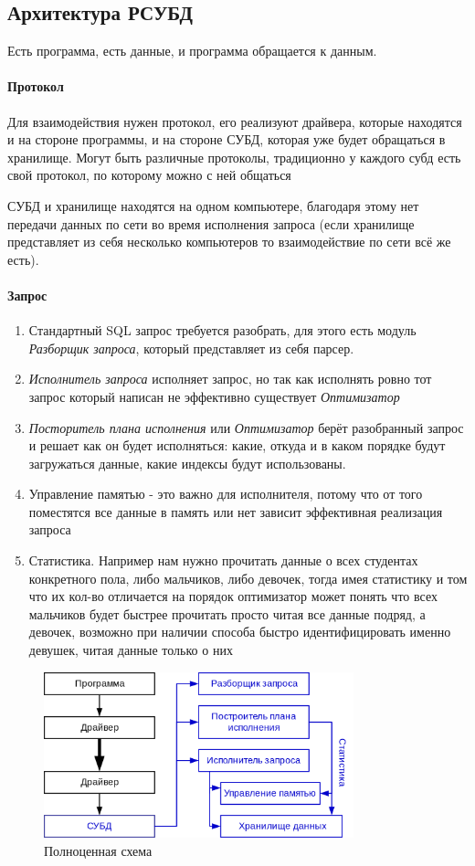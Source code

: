 \subsection{Архитектура РСУБД}
Есть программа, есть данные, и программа обращается к данным. \paragraph{Протокол} Для взаимодействия нужен протокол, его реализуют драйвера, которые находятся и на стороне программы, и на стороне СУБД, которая уже будет обращаться в хранилище. Могут быть различные протоколы, традиционно у каждого субд есть свой протокол, по которому можно с ней общаться
\begin{remark}
	СУБД и хранилище находятся на одном компьютере, благодаря этому нет передачи данных по сети во время исполнения запроса (если хранилище представляет из себя несколько компьютеров то взаимодействие по сети всё же есть).
\end{remark}
\paragraph{Запрос}
\begin{enumerate}
	\item Стандартный SQL запрос требуется разобрать, для этого есть модуль \textit{Разборщик запроса}, который представляет из себя парсер.
	\item \textit{Исполнитель запроса} исполняет запрос, но так как исполнять ровно тот запрос
	      который написан не эффективно существует \textit{Оптимизатор}
	\item \textit{Посторитель плана исполнения} или \textit{Оптимизатор} берёт разобранный запрос и
	      решает как он будет исполняться: какие, откуда и в каком порядке будут загружаться данные, какие индексы будут использованы.
	\item Управление памятью - это важно для исполнителя, потому что от того поместятся все данные в память или нет зависит эффективная реализация запроса
	\item Статистика. Например нам нужно прочитать данные о всех студентах конкретного пола, либо мальчиков, либо девочек, тогда имея статистику и том что их кол-во отличается на порядок оптимизатор может понять что всех мальчиков будет быстрее прочитать просто читая все данные подряд, а девочек, возможно при наличии способа быстро идентифицировать именно девушек, читая данные только о них
\end{enumerate}

\begin{figure}[h]
	\centering
	\includegraphics[width=0.8\textwidth]{../assets/kgeorgiy/intro/intro_arch_complete.svg.png}
	\caption{Полноценная схема}
	\label{proj-def}
\end{figure}
